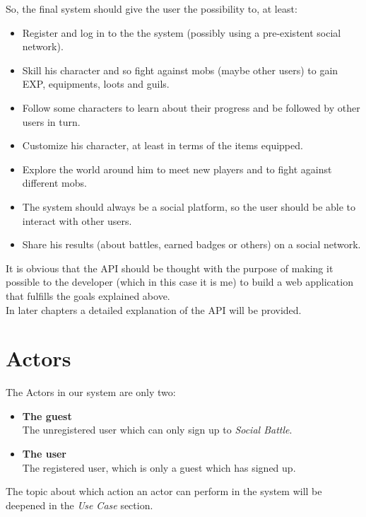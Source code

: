 	So, the final system should give the user the possibility to, at least:
	\newcommand{\goalSignup}{Register and log in to the the system (possibly using a pre-existent social network).}
	\newcommand{\goalSkill}{Skill his character and so fight against mobs (maybe other users) to gain
			EXP, equipments, loots and guils.}
	\newcommand{\goalFollow}{Follow some characters to learn about their progress and be followed by other users in turn.}
	\newcommand{\goalProfile}{Customize his character, at least in terms of the items equipped.}
	\newcommand{\goalExplore}{Explore the world around him to meet new players and to fight against different mobs.}
	\newcommand{\goalSocial}{The system should always be a social platform, so the user should be able to 
			interact with other users.}
	\newcommand{\goalShare}{Share his results (about battles, earned badges or others) on a social network.}
	\begin{itemize}
		\item \goalSignup
		\item \goalSkill
		\item \goalFollow
		\item \goalProfile
		\item \goalExplore
		\item \goalSocial
		\item \goalShare
	\end{itemize}

	It is obvious that the API should be thought with the purpose of making it possible to the developer 
	(which in this case it is me) to build a web application that fulfills the goals explained above.\\
	In later chapters a detailed explanation of the API will be provided.

	\section{Actors}
	The Actors in our system are only two:
	\begin{itemize}
		\item \textbf{The guest}\\
		The unregistered user which can only sign up to \textit{Social Battle}.
		\item \textbf{The user}\\
		The registered user, which is only a guest which has signed up.
	\end{itemize}
	The topic about which action an actor can perform in the system will be deepened in the \textit{Use Case} section.